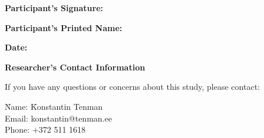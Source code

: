 \documentclass[11pt]{article}
\begin{document}
\vspace{0.5cm}

\noindent
\textbf{Participant's Signature:} \underline{\hspace{6cm}}

\noindent
\textbf{Participant's Printed Name:} \underline{\hspace{6cm}}

\noindent
\textbf{Date:} \underline{\hspace{6cm}}

\vspace{0.5cm}

\noindent
\textbf{Researcher’s Contact Information}

\noindent
If you have any questions or concerns about this study, please contact:

\begin{tabbing}
\hspace{3cm} \= Name: \hspace{1cm} \= Konstantin Tenman \\
\> Email: \> konstantin@tenman.ee \\
\> Phone: \> +372 511 1618
\end{tabbing}
\end{document}
